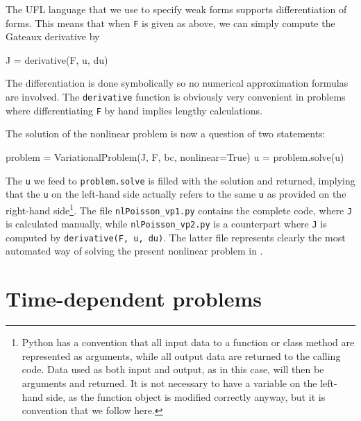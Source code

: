 The UFL language that we use to specify weak forms supports differentiation
of forms. This means that when {\fontsize{10pt}{10pt}\texttt{F}} is given as above, we can simply
compute the Gateaux derivative by
\begin{python}
J = derivative(F, u, du)
\end{python}
The differentiation is done symbolically so no numerical approximation
formulas are involved. The {\fontsize{10pt}{10pt}\texttt{derivative}} function is obviously
very convenient in problems where differentiating {\fontsize{10pt}{10pt}\texttt{F}} by hand
implies lengthy calculations.

The solution of the nonlinear problem is now a question of two statements:
\begin{python}
problem = VariationalProblem(J, F, bc, nonlinear=True)
u = problem.solve(u)
\end{python}
The {\fontsize{10pt}{10pt}\texttt{u}} we feed to {\fontsize{10pt}{10pt}\texttt{problem.solve}} is filled with the solution
and returned, implying that the {\fontsize{10pt}{10pt}\texttt{u}} on the left-hand side actually
refers to the same {\fontsize{10pt}{10pt}\texttt{u}} as provided on the right-hand side\footnote{Python
has a convention that all input data to a function or class method are
represented as arguments, while all output data are returned to the calling
code. Data used as both input and output, as in this case, will then be
arguments and returned. It is not necessary to have a variable on the
left-hand side, as the function object is modified correctly anyway,
but it is convention that we follow here.}.
The file {\fontsize{10pt}{10pt}\verb!nlPoisson_vp1.py!} contains the complete code, where
{\fontsize{10pt}{10pt}\texttt{J}} is calculated manually, while {\fontsize{10pt}{10pt}\verb!nlPoisson_vp2.py!} is
a counterpart where {\fontsize{10pt}{10pt}\texttt{J}} is computed by {\fontsize{10pt}{10pt}\texttt{derivative(F, u, du)}}.
The latter file represents clearly the most automated way of solving
the present nonlinear problem in \fenics.


\section{Time-dependent problems}
\label{langtangen:timedep}

